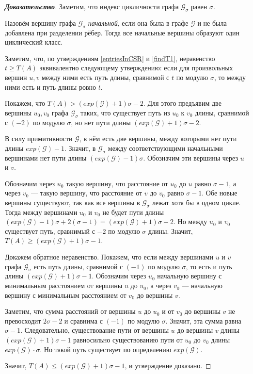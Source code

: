 \documentclass[12pt]{article}
\theoremstyle{definition}
\begin{document}
\begin{proof}[\textbf{Доказательство}] 
Заметим, что индекс цикличности графа $\mathcal{G}_\sigma$ равен $\sigma$.

Назовём вершину графа $\mathcal{G}_\sigma$ \textit{начальной}, если она была в графе $\mathcal{G}$ и не была добавлена при разделении рёбер. Тогда все начальные вершины образуют один циклический класс.

Заметим, что, по утверждениям \ref{entriesInCSR} и \ref{findT1}, неравенство $t \ge T(A)$ эквивалентно следующему утверждению: если для произвольных вершин $u, v$ между ними есть путь длины,  сравнимой с $t$ по модулю $\sigma$, то между ними есть и путь длины ровно $t$.

Покажем, что $T(A) > (exp(\mathcal{G}) + 1)\sigma - 2$. Для этого предъявим две вершины $u_0, v_0$ графа $\mathcal{G}_\sigma$ таких, что существует путь из $u_0$ к $v_0$ длины, сравнимой с $(-2)$ по модулю $\sigma$, но нет пути длины $(exp(\mathcal{G}) + 1)\sigma - 2$.

В силу примитивности $\mathcal{G}$, в нём есть две вершины, между которыми нет пути длины $exp(\mathcal{G}) - 1$. Значит, в $\mathcal{G}_\sigma$ между соответствующими начальными вершинами нет пути длины $(exp(\mathcal{G}) - 1)\sigma$. Обозначим эти вершины через $u$ и $v$.

Обозначим через $u_0$ такую вершину, что расстояние от $u_0$ до $u$ равно $\sigma - 1$, а через $v_0$ --- такую вершину, что расстояние от $v$ до $v_0$ равно $\sigma - 1$. Обе новые вершины существуют, так как все вершины в $\mathcal{G}_{\sigma}$ лежат хотя бы в одном цикле. Тогда между вершинами $u_0$ и $v_0$ не будет пути длины $(exp(\mathcal{G})- 1)\sigma + 2(\sigma - 1) = (exp(\mathcal{G}) + 1)\sigma - 2$. Но между $u_0$ и $v_0$ существует путь, сравнимый с $-2$ по модулю $\sigma$ длины. Значит, $T(A) \ge (exp(\mathcal{G}) + 1)\sigma - 1$.

Докажем обратное неравенство. Покажем, что если между вершинами $u$ и $v$ графа $\mathcal{G}_\sigma$ есть путь длины, сравнимой с $(-1)$ по модулю $\sigma$, то есть и путь длины $(exp(\mathcal{G}) + 1)\sigma - 1$. Обозначим через $u_0$ начальную вершину с минимальным расстоянием от вершины $u$ до $u_0$, а через $v_0$ --- начальную вершину с минимальным расстоянием от $v_0$ до вершины $v$.

Заметим, что сумма расстояний от вершины $u$ до $u_0$ и от $v_0$ до вершины $v$ не превосходит $2\sigma - 2$ и сравнима с $(-1)$ по модулю $\sigma$. Значит, эта сумма равна $\sigma - 1$. Следовательно, существование пути от вершины $u$ до вершины $v$ длины $(exp(\mathcal{G}) + 1)\sigma - 1$ равносильно существованию пути от $u_0$ до $v_0$ длины $exp(\mathcal{G}) \cdot \sigma$. Но такой путь существует по определению $exp(\mathcal{G})$.

Значит, $T(A) \le (exp(\mathcal{G}) + 1)\sigma - 1$, и утверждение доказано.
\end{proof}
\end{document}
